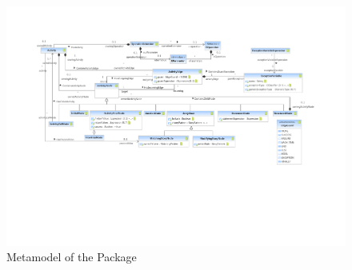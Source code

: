 %
%

\begin{figure}[htbp]
  \centering
  \includegraphics[width=\textheight,
  angle=90]{figures/A_technical-reference/packages/storydiagrams_activities/storydiagrams-activities}
  \caption{Metamodel of the  Package}
  \label{fig:MM:activities}
\end{figure}
